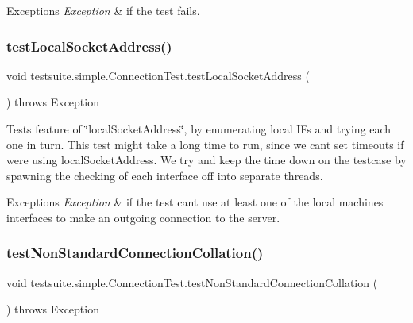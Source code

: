 \begin{DoxyExceptions}{Exceptions}
{\em Exception} & if the test fails. \\
\hline
\end{DoxyExceptions}
\mbox{\label{classtestsuite_1_1simple_1_1_connection_test_af716a61440ab4bf588f5160f6ca5aafb}} 
\subsubsection{\texorpdfstring{test\+Local\+Socket\+Address()}{testLocalSocketAddress()}}
{\footnotesize\ttfamily void testsuite.\+simple.\+Connection\+Test.\+test\+Local\+Socket\+Address (\begin{DoxyParamCaption}{ }\end{DoxyParamCaption}) throws Exception}

Tests feature of \char`\"{}local\+Socket\+Address\char`\"{}, by enumerating local IF\textquotesingle{}s and trying each one in turn. This test might take a long time to run, since we can\textquotesingle{}t set timeouts if we\textquotesingle{}re using local\+Socket\+Address. We try and keep the time down on the testcase by spawning the checking of each interface off into separate threads.


\begin{DoxyExceptions}{Exceptions}
{\em Exception} & if the test can\textquotesingle{}t use at least one of the local machine\textquotesingle{}s interfaces to make an outgoing connection to the server. \\
\hline
\end{DoxyExceptions}
\mbox{\label{classtestsuite_1_1simple_1_1_connection_test_a8965be404ac9488d5926ecd89eaeb919}} 
\subsubsection{\texorpdfstring{test\+Non\+Standard\+Connection\+Collation()}{testNonStandardConnectionCollation()}}
{\footnotesize\ttfamily void testsuite.\+simple.\+Connection\+Test.\+test\+Non\+Standard\+Connection\+Collation (\begin{DoxyParamCaption}{ }\end{DoxyParamCaption}) throws Exception}


